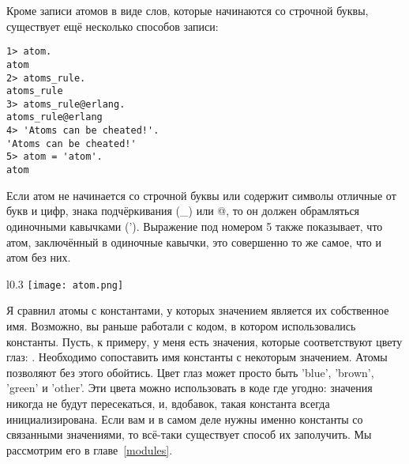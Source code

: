 Кроме записи атомов в виде слов, которые начинаются со строчной буквы, существует ещё несколько способов записи:
\begin{lstlisting}[style=repl]
1> atom.
atom
2> atoms_rule.
atoms_rule
3> atoms_rule@erlang.
atoms_rule@erlang
4> 'Atoms can be cheated!'.
'Atoms can be cheated!'
5> atom = 'atom'.
atom
\end{lstlisting}

Если атом не начинается со строчной буквы или содержит символы отличные от букв и цифр, знака подчёркивания (\_) или @, то он должен обрамляться одиночными кавычками (').
Выражение под номером 5 также показывает, что атом, заключённый в одиночные кавычки, это совершенно то же самое, что и атом без них.

\begin{wrapfigure}{l}{0.3\linewidth}
    \texttt{[image: atom.png]}
\end{wrapfigure}
Я сравнил атомы с константами, у которых значением является их собственное имя.
Возможно, вы раньше работали с кодом, в котором использовались константы.
Пусть, к примеру, у меня есть значения, которые соответствуют цвету глаз:  .
Необходимо сопоставить имя константы с некоторым значением.
Атомы позволяют без этого обойтись.
Цвет глаз может просто быть 'blue', 'brown', 'green' и 'other'.
Эти цвета можно использовать в коде где угодно: значения никогда не будут пересекаться, и, вдобавок, такая константа всегда инициализирована.
Если вам и в самом деле нужны именно константы со связанными значениями, то всё\--таки существует способ их заполучить.
Мы рассмотрим его в главе~\ref{modules}.

